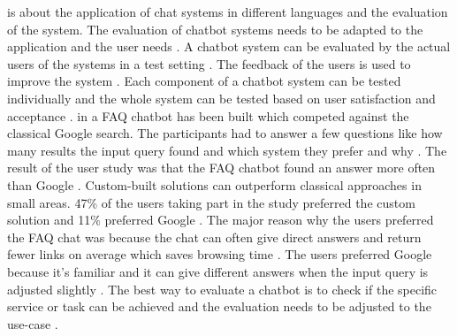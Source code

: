 \citet{evaluateChatbotsShawar2007} is about the application of chat systems in different languages and the evaluation of the system.
The evaluation of chatbot systems needs to be adapted to the application and the user needs \cite{evaluateChatbotsShawar2007}.
A chatbot system can be evaluated by the actual users of the systems in a test setting \cite{evaluateChatbotsShawar2007}.
The feedback of the users is used to improve the system \cite{evaluateChatbotsShawar2007}. 
Each component of a chatbot system can be tested individually and the whole system can be tested based on user satisfaction and acceptance \cite{evaluateChatbotsShawar2007}.
in \citet{evaluateChatbotsShawar2007} a FAQ chatbot has been built which competed against the classical Google search.
The participants had to answer a few questions like how many results the input query found and which system they prefer and why \cite{evaluateChatbotsShawar2007}. 
The result of the user study was that the FAQ chatbot found an answer more often than Google \cite{evaluateChatbotsShawar2007}.
Custom-built solutions can outperform classical approaches in small areas.
47\% of the users taking part in the study preferred the custom solution and 11\% preferred Google \cite{evaluateChatbotsShawar2007}.
The major reason why the users preferred the FAQ chat was because the chat can often give direct answers and return fewer links on average which saves browsing time \cite{evaluateChatbotsShawar2007}. 
The users preferred Google because it's familiar and it can give different answers when the input query is adjusted slightly \cite{evaluateChatbotsShawar2007}.
The best way to evaluate a chatbot is to check if the specific service or task can be achieved and the evaluation needs to be adjusted to the use-case \cite{evaluateChatbotsShawar2007}.

